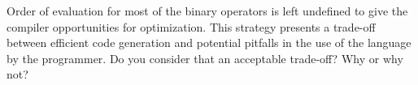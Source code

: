 %
%
\begin{question}
Order of evaluation for most of the binary operators is left
undefined to give the compiler opportunities for optimization. This strategy
presents a trade-off between efficient code generation and potential pitfalls in
the use of the language by the programmer. Do you consider that an
acceptable trade-off? Why or why not?
\end{question}
